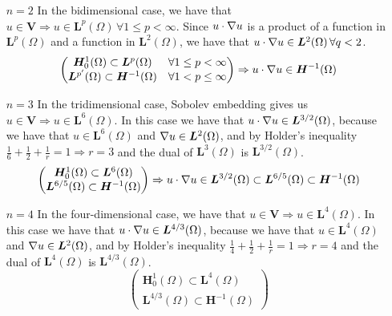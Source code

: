 \begin{itemize}
    \item[\(n = 2\)] In the bidimensional case, we have that \(u \in \bm{V} \Rightarrow u \in \bm{L}^p(\Omega) \, \forall 1 \leq p < \infty\). Since \(u \cdot \nabla u\) is a product of a function in \(\bm{L}^p(\Omega)\) and a function in \(\bm{L}^2(\Omega)\), we have that \(u \cdot \nabla u \in \bm{L}^2(\Omega) \, \forall q < 2\).
          \[
              \begin{pmatrix*}
                  \bm{H}^1_0(\Omega) \subset \bm{L}^p{(\Omega)} & \forall 1 \leq p < \infty \\
                  \bm{L}^{p'}(\Omega) \subset \bm{H}^{-1}(\Omega) & \forall 1 < p \leq \infty
              \end{pmatrix*}
              \Rightarrow u \cdot \grad u \in \bm{H}^{-1}(\Omega)
          \]
    \item[\(n = 3\)] In the tridimensional case, Sobolev embedding gives us \(u \in \bm{V} \Rightarrow u \in \bm{L}^6(\Omega)\). In this case we have that \(u \cdot \nabla u \in \bm{L}^{3/2}(\Omega)\), because we have that \(u \in \bm{L}^6(\Omega)\) and \(\nabla u \in \bm{L}^2(\Omega)\), and by Holder's inequality \(\frac{1}{6} + \frac{1}{2} + \frac{1}{r} = 1 \Rightarrow r = 3\) and the dual of \(\bm{L}^{3}(\Omega)\) is \(\bm{L}^{3/2}(\Omega)\).
          \[
              \begin{pmatrix*}
                  \bm{H}^1_0(\Omega) \subset \bm{L}^6{(\Omega)}  \\
                  \bm{L}^{6/5}(\Omega) \subset \bm{H}^{-1}(\Omega)
              \end{pmatrix*}
              \Rightarrow u \cdot \grad u \in \bm{L}^{3/2}(\Omega) \subset \bm{L}^{6/5}(\Omega) \subset \bm{H}^{-1}(\Omega)
          \]
    \item[\(n = 4\)] In the four-dimensional case, we have that \(u \in \bm{V} \Rightarrow u \in \bm{L}^4(\Omega)\). In this case we have that \(u \cdot \nabla u \in \bm{L}^{4/3}(\Omega)\), because we have that \(u \in \bm{L}^4(\Omega)\) and \(\nabla u \in \bm{L}^2(\Omega)\), and by Holder's inequality \(\frac{1}{4} + \frac{1}{2} + \frac{1}{r} = 1 \Rightarrow r = 4\) and the dual of \(\bm{L}^{4}(\Omega)\) is \(\bm{L}^{4/3}(\Omega)\).
          \[
              \begin{pmatrix*}
                  \bm{H}^1_0(\Omega) \subset \bm{L}^4{(\Omega)}  \\
                  \bm{L}^{4/3}(\Omega) \subset \bm{H}^{-1}(\Omega)
              \end{pmatrix*}
\]
\end{itemize}
